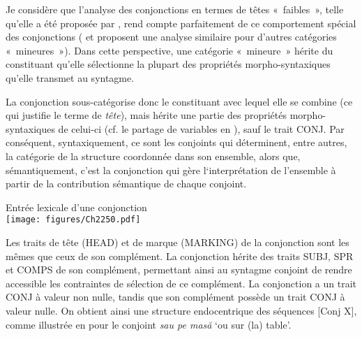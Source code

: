 Je considère que l’analyse des conjonctions en termes de têtes «~faibles~», telle qu’elle a été proposée par \citet{Abeille2003,Abeille2005}, rend compte parfaitement de ce comportement spécial des conjonctions (\citealt{Sag1997} et \citealt{Tseng2002} proposent une analyse similaire pour d’autres catégories «~mineures~»). Dans cette perspective, une catégorie «~mineure~» hérite du constituant qu’elle sélectionne la plupart des propriétés morpho-syntaxiques qu’elle transmet au syntagme. 

La conjonction sous-catégorise donc le constituant avec lequel elle se combine (ce qui justifie le terme de \textit{tête}), mais hérite une partie des propriétés morpho-syntaxiques de celui-ci (cf. le partage de variables en ), sauf le trait CONJ. Par conséquent, syntaxiquement, ce sont les conjoints qui déterminent, entre autres, la catégorie de la structure coordonnée dans son ensemble, alors que, sémantiquement, c’est la conjonction qui gère l‘interprétation de l’ensemble à partir de la contribution sémantique de chaque conjoint.

\ea \label{ch2:ex250}
Entrée lexicale d’une conjonction\\
\texttt{[image: figures/Ch2250.pdf]}

                        
\z

Les traits de tête (HEAD) et de marque (MARKING) de la conjonction sont les mêmes que ceux de son complément. La conjonction hérite des traits SUBJ, SPR et COMPS de son complément, permettant ainsi au syntagme conjoint de rendre accessible les contraintes de sélection de ce complément. La conjonction a un trait CONJ à valeur non nulle, tandis que son complément possède un trait CONJ à valeur nulle. On obtient ainsi une structure endocentrique des séquences [Conj X], comme illustrée en  pour le conjoint \textit{sau pe masă} ‘ou sur (la) table’. 

